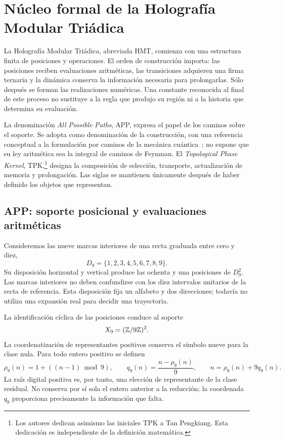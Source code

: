\section{Núcleo formal de la Holografía Modular Triádica}
\label{sec:nucleo}

La Holografía Modular Triádica, abreviada HMT, comienza con una estructura finita de posiciones y operaciones. El orden de construcción importa: las posiciones reciben evaluaciones aritméticas, las transiciones adquieren una firma ternaria y la dinámica conserva la información necesaria para prolongarlas. Sólo después se forman las realizaciones numéricas. Una constante reconocida al final de este proceso no sustituye a la regla que produjo su región ni a la historia que determina su evaluación.

La denominación \emph{All Possible Paths}, APP, expresa el papel de los caminos sobre el soporte. Se adopta como denominación de la construcción, con una referencia conceptual a la formulación por caminos de la mecánica cuántica~\cite{feynman1948}; no supone que su ley aritmética sea la integral de caminos de Feynman. El \emph{Topological Phase Kernel}, TPK,\footnote{Los autores dedican asimismo las iniciales TPK a Tan Pengkiang. Esta dedicación es independiente de la definición matemática.} designa la composición de selección, transporte, actualización de memoria y prolongación. Las siglas se mantienen únicamente después de haber definido los objetos que representan.

\subsection{APP: soporte posicional y evaluaciones aritméticas}

Consideremos las nueve marcas interiores de una recta graduada entre cero y diez,
\[
 D_9=\{1,2,3,4,5,6,7,8,9\}.
\]
Su disposición horizontal y vertical produce las ochenta y una posiciones de \(D_9^2\). Las marcas interiores no deben confundirse con los diez intervalos unitarios de la recta de referencia. Esta disposición fija un alfabeto y dos direcciones; todavía no utiliza una expansión real para decidir una trayectoria.

La identificación cíclica de las posiciones conduce al soporte
\[
 X_9=(\mathbb Z/9\mathbb Z)^2.
\]
La coordenatización de representantes positivos conserva el símbolo nueve para la clase nula. Para todo entero positivo se definen
\begin{equation}
 \rho_9(n)=1+((n-1)\bmod9),\qquad
 q_9(n)=\frac{n-\rho_9(n)}9,
 \qquad n=\rho_9(n)+9q_9(n).
 \label{eq:residuo-cociente}
\end{equation}
La raíz digital positiva es, por tanto, una elección de representante de la clase residual. No conserva por sí sola el entero anterior a la reducción; la coordenada \(q_9\) proporciona precisamente la información que falta.

